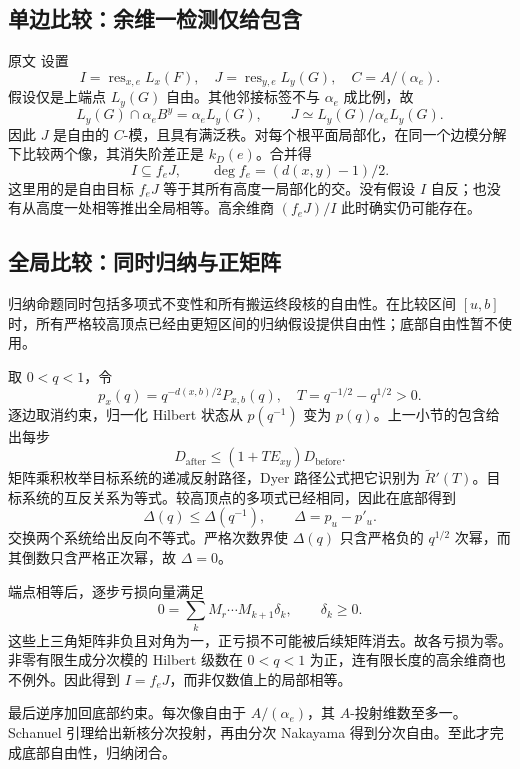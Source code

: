 \subsection{单边比较：余维一检测仅给包含}\label{audit:edge-bound}
原文  设置
\[
I=\operatorname{res}_{x,e}L_x(F),\quad
J=\operatorname{res}_{y,e}L_y(G),\quad C=A/(\alpha_e).
\]
假设仅是上端点 \(L_y(G)\) 自由。其他邻接标签不与 \(\alpha_e\) 成比例，故
\[
L_y(G)\cap\alpha_e B^y=\alpha_e L_y(G),\qquad
J\simeq L_y(G)/\alpha_e L_y(G).
\]
因此 \(J\) 是自由的 \(C\)-模，且具有满泛秩。对每个根平面局部化，在同一个边模分解下比较两个像，其消失阶差正是 \(k_D(e)\)。合并得
\[
I\subseteq f_eJ,\qquad
\deg f_e=(d(x,y)-1)/2.
\]
这里用的是自由目标 \(f_eJ\) 等于其所有高度一局部化的交。没有假设 \(I\) 自反；也没有从高度一处相等推出全局相等。高余维商 \((f_eJ)/I\) 此时确实仍可能存在。

\subsection{全局比较：同时归纳与正矩阵}\label{audit:comparison}
归纳命题同时包括多项式不变性和所有搬运终段核的自由性。在比较区间 \([u,b]\) 时，所有严格较高顶点已经由更短区间的归纳假设提供自由性；底部自由性暂不使用。

取 \(0<q<1\)，令
\[
p_x(q)=q^{-d(x,b)/2}P_{x,b}(q),\quad
T=q^{-1/2}-q^{1/2}>0.
\]
逐边取消约束，归一化 Hilbert 状态从 \(p(q^{-1})\) 变为 \(p(q)\)。上一小节的包含给出每步
\[
D_{\mathrm{after}}\le (1+T E_{xy})D_{\mathrm{before}}.
\]
矩阵乘积枚举目标系统的递减反射路径，Dyer 路径公式把它识别为 \(\widetilde R'(T)\)。目标系统的互反关系为等式。较高顶点的多项式已经相同，因此在底部得到
\[
\Delta(q)\le\Delta(q^{-1}),\qquad \Delta=p_u-p'_u.
\]
交换两个系统给出反向不等式。严格次数界使 \(\Delta(q)\) 只含严格负的 \(q^{1/2}\) 次幂，而其倒数只含严格正次幂，故 \(\Delta=0\)。

端点相等后，逐步亏损向量满足
\[
0=\sum_k M_r\cdots M_{k+1}\delta_k,\qquad \delta_k\ge0.
\]
这些上三角矩阵非负且对角为一，正亏损不可能被后续矩阵消去。故各亏损为零。非零有限生成分次模的 Hilbert 级数在 \(0<q<1\) 为正，连有限长度的高余维商也不例外。因此得到 \(I=f_eJ\)，而非仅数值上的局部相等。

最后逆序加回底部约束。每次像自由于 \(A/(\alpha_e)\)，其 \(A\)-投射维数至多一。Schanuel 引理给出新核分次投射，再由分次 Nakayama 得到分次自由。至此才完成底部自由性，归纳闭合。
